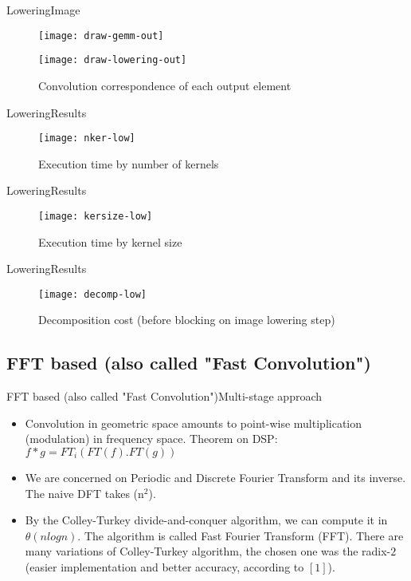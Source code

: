 \documentclass{beamer}
\begin{document}
\begin{frame}{Lowering}{Image}
\begin{figure}[ht] \label{ fig8} 
    \texttt{[image: draw-gemm-out]} 
    \caption{Output (C) obtained from lowered image (A) multiplied by lowered kernel (B)} 
    
    \texttt{[image: draw-lowering-out]}
    \caption{Convolution correspondence of each output element} 
    \end{figure}
\end{frame}

 \begin{frame}{Lowering}{Results}
\begin{figure}[ht] \label{ fig7} 
      \texttt{[image: nker-low]}
    \caption{Execution time by number of kernels} 
\end{figure}
\end{frame}

\begin{frame}{Lowering}{Results}
\begin{figure}[ht] \label{ fig7} 
     \texttt{[image: kersize-low]}
    \caption{Execution time by kernel size} 
\end{figure}
\end{frame}

\begin{frame}{Lowering}{Results}
\begin{figure}[ht] \label{ fig7} 
     \texttt{[image: decomp-low]}
    \caption{Decomposition cost (before blocking on image lowering step)} 
\end{figure}
\end{frame}

\subsection{FFT based (also called "Fast Convolution")}

\begin{frame}{FFT based (also called "Fast Convolution")}{Multi-stage approach}
  \begin{itemize}
  \item {
    Convolution in geometric space amounts to point-wise multiplication (modulation) in frequency space. Theorem on DSP: $f * g = FT_i(FT(f).FT(g))$
  }

  \item {
    We are concerned on Periodic and Discrete Fourier Transform and its inverse. The naive DFT takes \theta(n$^{2}$).  
  }
  \item {
   By the Colley-Turkey divide-and-conquer algorithm, we can compute it in $\theta(nlogn)$. The algorithm is called \alert{Fast Fourier Transform (FFT)}. There are many variations of Colley-Turkey algorithm, the chosen one was the radix-$2$ (easier implementation and better accuracy, according to $[1]$).
  }
  \end{itemize}
\end{frame}
\end{document}
